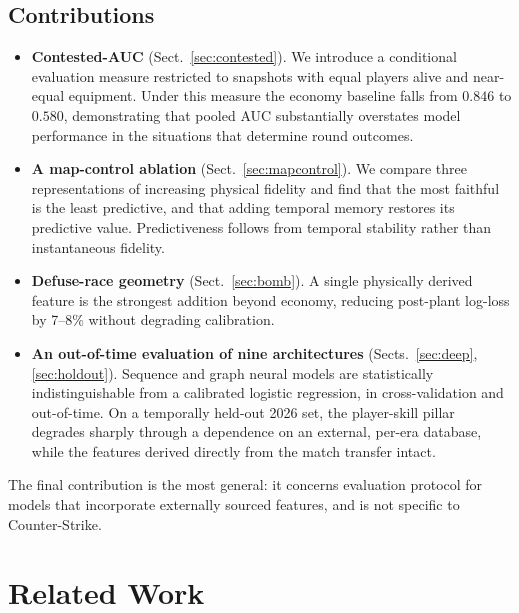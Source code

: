 \documentclass[11pt,a4paper]{article}
\begin{document}
\subsection{Contributions}

\begin{itemize}
  \item \textbf{Contested-AUC} (Sect.~\ref{sec:contested}). We introduce a conditional
    evaluation measure restricted to snapshots with equal players alive and near-equal
    equipment. Under this measure the economy baseline falls from $0.846$ to $0.580$,
    demonstrating that pooled AUC substantially overstates model performance in the
    situations that determine round outcomes.
  \item \textbf{A map-control ablation} (Sect.~\ref{sec:mapcontrol}). We compare three
    representations of increasing physical fidelity and find that the most faithful is
    the least predictive, and that adding temporal memory restores its predictive value.
    Predictiveness follows from temporal stability rather than instantaneous fidelity.
  \item \textbf{Defuse-race geometry} (Sect.~\ref{sec:bomb}). A single physically
    derived feature is the strongest addition beyond economy, reducing post-plant
    log-loss by 7--8\% without degrading calibration.
  \item \textbf{An out-of-time evaluation of nine architectures} (Sects.~\ref{sec:deep},
    \ref{sec:holdout}). Sequence and graph neural models are statistically
    indistinguishable from a calibrated logistic regression, in cross-validation and
    out-of-time. On a temporally held-out 2026 set, the player-skill pillar degrades
    sharply through a dependence on an external, per-era database, while the features
    derived directly from the match transfer intact.
\end{itemize}

The final contribution is the most general: it concerns evaluation protocol for models
that incorporate externally sourced features, and is not specific to Counter-Strike.

\section{Related Work}
\label{sec:related}
\end{document}
